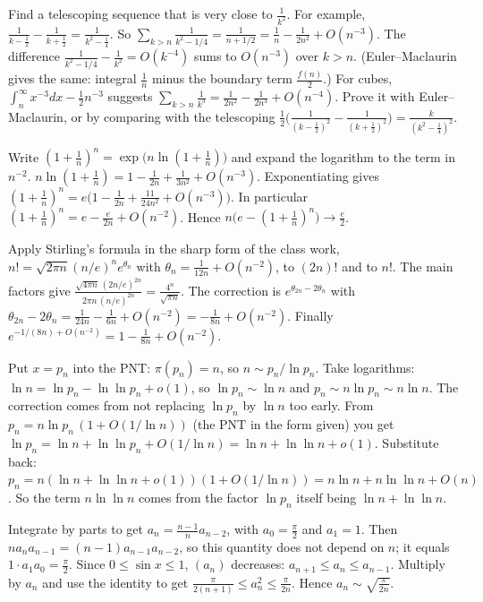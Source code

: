 \documentclass[11pt,a4paper]{article}
\begin{document}

 Find a telescoping sequence that is very close to $\frac1{k^2}$. For example, $\frac1{k-\frac12}-\frac1{k+\frac12}=\frac1{k^2-\frac14}$.
 So $\sum_{k>n}\frac1{k^2-1/4}=\frac1{n+1/2}=\frac1n-\frac1{2n^2}+O(n^{-3})$. The difference $\frac1{k^2-1/4}-\frac1{k^2}=O(k^{-4})$ sums to $O(n^{-3})$ over $k>n$. (Euler--Maclaurin gives the same: integral $\frac1n$ minus the boundary term $\frac{f(n)}2$.)
 For cubes, $\int_n^\infty x^{-3}dx-\frac12n^{-3}$ suggests $\sum_{k>n}\frac1{k^3}=\frac1{2n^2}-\frac1{2n^3}+O(n^{-4})$. Prove it with Euler--Maclaurin, or by comparing with the telescoping $\frac12\bigl(\frac1{(k-\frac12)^2}-\frac1{(k+\frac12)^2}\bigr)=\frac{k}{(k^2-\frac14)^2}$.

 Write $(1+\frac1n)^n=\exp\bigl(n\ln(1+\frac1n)\bigr)$ and expand the logarithm to the term in $n^{-2}$.
 $n\ln(1+\frac1n)=1-\frac1{2n}+\frac1{3n^2}+O(n^{-3})$. Exponentiating gives $(1+\frac1n)^n=e\bigl(1-\frac1{2n}+\frac{11}{24n^2}+O(n^{-3})\bigr)$. In particular $(1+\frac1n)^n=e-\frac{e}{2n}+O(n^{-2})$.
 Hence $n\bigl(e-(1+\frac1n)^n\bigr)\to\frac e2$.

 Apply Stirling's formula in the sharp form of the class work, $n!=\sqrt{2\pi n}(n/e)^ne^{\theta_n}$ with $\theta_n=\frac1{12n}+O(n^{-2})$, to $(2n)!$ and to $n!$.
 The main factors give $\frac{\sqrt{4\pi n}\,(2n/e)^{2n}}{2\pi n\,(n/e)^{2n}}=\frac{4^n}{\sqrt{\pi n}}$. The correction is $e^{\theta_{2n}-2\theta_n}$ with $\theta_{2n}-2\theta_n=\frac1{24n}-\frac1{6n}+O(n^{-2})=-\frac1{8n}+O(n^{-2})$.
 Finally $e^{-1/(8n)+O(n^{-2})}=1-\frac1{8n}+O(n^{-2})$.

 Put $x=p_n$ into the PNT: $\pi(p_n)=n$, so $n\sim p_n/\ln p_n$. Take logarithms: $\ln n=\ln p_n-\ln\ln p_n+o(1)$, so $\ln p_n\sim\ln n$ and $p_n\sim n\ln p_n\sim n\ln n$.
 The correction comes from not replacing $\ln p_n$ by $\ln n$ too early. From $p_n=n\ln p_n\,(1+O(1/\ln n))$ (the PNT in the form given) you get $\ln p_n=\ln n+\ln\ln p_n+O(1/\ln n)=\ln n+\ln\ln n+o(1)$.
 Substitute back: $p_n=n(\ln n+\ln\ln n+o(1))(1+O(1/\ln n))=n\ln n+n\ln\ln n+O(n)$. So the term $n\ln\ln n$ comes from the factor $\ln p_n$ itself being $\ln n+\ln\ln n$.

 Integrate by parts to get $a_n=\frac{n-1}{n}a_{n-2}$, with $a_0=\frac\pi2$ and $a_1=1$.
 Then $na_na_{n-1}=(n-1)a_{n-1}a_{n-2}$, so this quantity does not depend on $n$; it equals $1\cdot a_1a_0=\frac\pi2$.
 Since $0\le\sin x\le1$, $(a_n)$ decreases: $a_{n+1}\le a_n\le a_{n-1}$. Multiply by $a_n$ and use the identity to get $\frac{\pi}{2(n+1)}\le a_n^2\le\frac{\pi}{2n}$. Hence $a_n\sim\sqrt{\frac{\pi}{2n}}$.
\end{document}
